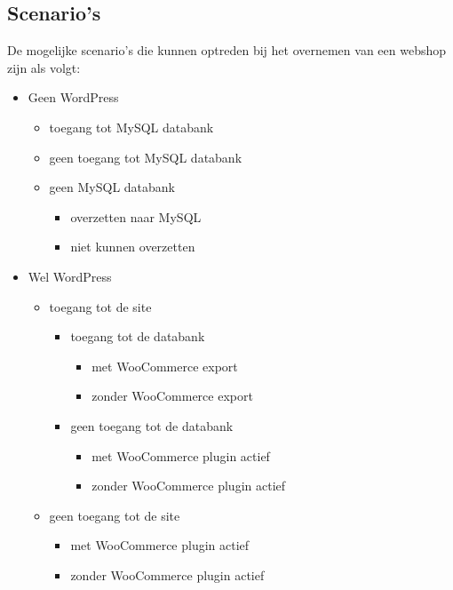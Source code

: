 \subsection{Scenario's}
De mogelijke scenario's die kunnen optreden bij het overnemen van een webshop zijn als volgt:
\begin{itemize}
    \item Geen WordPress
    \begin{itemize}
        \item toegang tot MySQL databank
        \item geen toegang tot MySQL databank
        \item geen MySQL databank
        \begin{itemize}
           \item overzetten naar MySQL
           \item niet kunnen overzetten
       \end{itemize} 
    \end{itemize}
    \item Wel WordPress 
    \begin{itemize}
        \item toegang tot de site
        \begin{itemize}
            \item toegang tot de databank
            \begin{itemize}
                \item met WooCommerce export
                \item zonder WooCommerce export
            \end{itemize} 
            \item geen toegang tot de databank
            \begin{itemize}
                \item met WooCommerce plugin actief
                \item zonder WooCommerce plugin actief
            \end{itemize} 
        \end{itemize} 
        \item geen toegang tot de site
        \begin{itemize}
            \item met WooCommerce plugin actief
            \item zonder WooCommerce plugin actief
        \end{itemize} 
    \end{itemize} 
\end{itemize} 

